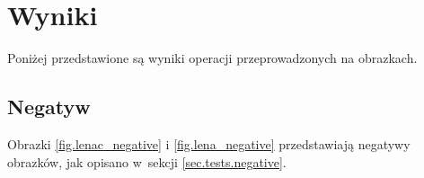 \documentclass{classrep}
\begin{document}
\clearpage

\section{Wyniki}
Poniżej przedstawione są wyniki operacji przeprowadzonych na obrazkach.

\subsection{Negatyw}
Obrazki \ref{fig.lenac_negative} i \ref{fig.lena_negative} przedstawiają negatywy obrazków, jak opisano w~sekcji \ref{sec.tests.negative}.

\begin{figure}
\end{figure}
\end{document}
